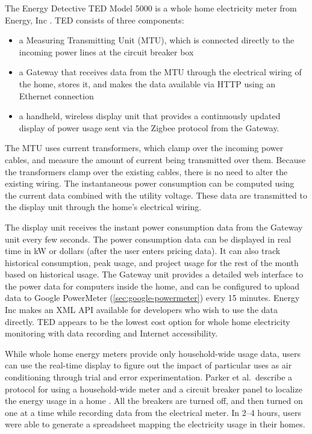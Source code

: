 The Energy Detective TED Model 5000 is a whole home electricity meter from Energy, Inc \cite{the-energy-detective}. TED consists of three components:

\begin{itemize}
	\item a Measuring Transmitting Unit (MTU), which is connected directly to the incoming power lines at the circuit breaker box
	\item a Gateway that receives data from the MTU through the electrical wiring of the home, stores it, and makes the data available via HTTP using an Ethernet connection
	\item a handheld, wireless display unit that provides a continuously updated display of power usage sent via the Zigbee protocol from the Gateway.
\end{itemize}

The MTU uses current transformers, which clamp over the incoming power cables, and measure the amount of current being transmitted over them. Because the transformers clamp over the existing cables, there is no need to alter the existing wiring. The instantaneous power consumption can be computed using the current data combined with the utility voltage. These data are transmitted to the display unit through the home's electrical wiring.

The display unit receives the instant power consumption data from the Gateway unit every few seconds. The power consumption data can be displayed in real time in kW or dollars (after the user enters pricing data). It can also track historical consumption, peak usage, and project usage for the rest of the month based on historical usage. The Gateway unit provides a detailed web interface to the power data for computers inside the home, and can be configured to upload data to Google PowerMeter (\autoref{sec:google-powermeter}) every 15 minutes. Energy Inc makes an XML API available for developers who wish to use the data directly. TED appears to be the lowest cost option for whole home electricity monitoring with data recording and Internet accessibility.

While whole home energy meters provide only household-wide usage data, users can use the real-time display to figure out the impact of particular uses as air conditioning through trial and error experimentation. Parker et al.\ describe a protocol for using a household-wide meter and a circuit breaker panel to localize the energy usage in a home \cite{Parker2006How-Much-Energy}. All the breakers are turned off, and then turned on one at a time while recording data from the electrical meter. In 2--4 hours, users were able to generate a spreadsheet mapping the electricity usage in their homes.

